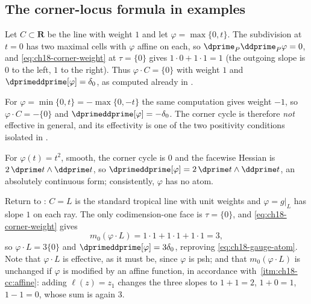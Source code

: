 \subsection{The corner-locus formula in examples}
\label{sec:ch18-corner-examples}

\begin{example}
\label{ex:ch18-corner-dim-one}
Let $C\subset\mathbf R$ be the line with weight $1$ and let
$\varphi=\max\{0,t\}$.  The subdivision at $t=0$ has two maximal cells with
$\varphi$ affine on each, so $\dprime_P\ddprime_P\varphi=0$, and
\eqref{eq:ch18-corner-weight} at $\tau=\{0\}$ gives
$1\cdot0+1\cdot1=1$ (the outgoing slope is $0$ to the left, $1$ to the
right).  Thus $\varphi\cdot C=\{0\}$ with weight $1$ and
$\dprimeddprime[\varphi]=\delta_0$, as computed already in
.

For $\varphi=\min\{0,t\}=-\max\{0,-t\}$ the same computation gives weight
$-1$, so $\varphi\cdot C=-\{0\}$ and $\dprimeddprime[\varphi]=-\delta_0$.
The corner cycle is therefore \emph{not} effective in general, and its
effectivity is one of the two positivity conditions isolated in
.

For $\varphi(t)=t^2$, smooth, the corner cycle is $0$ and the facewise
Hessian is $2\,\dprime t\wedge\ddprime t$, so
$\dprimeddprime[\varphi]=2\,\dprime t\wedge\ddprime t$, an absolutely
continuous form; consistently, $\varphi$ has no atom.
\end{example}

\begin{example}
\label{ex:ch18-gauge-corner}
Return to : $C=L$ is the standard tropical line
with unit weights and $\varphi=g|_L$ has slope $1$ on each ray.  The only
codimension-one face is $\tau=\{0\}$, and \eqref{eq:ch18-corner-weight}
gives
\[
 m_0(\varphi\cdot L)=1\cdot1+1\cdot1+1\cdot1=3 ,
\]
so $\varphi\cdot L=3\{0\}$ and $\dprimeddprime[\varphi]=3\delta_0$,
reproving \eqref{eq:ch18-gauge-atom}.  Note that $\varphi\cdot L$ is
effective, as it must be, since $\varphi$ is psh; and that
$m_0(\varphi\cdot L)$ is unchanged if $\varphi$ is modified by an affine
function, in accordance with
\,\cref{itm:ch18-cc:affine}: adding
$\ell(z)=z_1$ changes the three slopes to $1+1=2$, $1+0=1$, $1-1=0$, whose
sum is again $3$.
\end{example}

